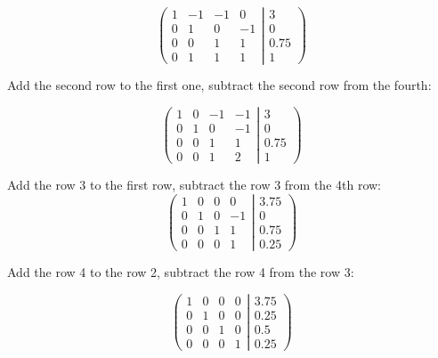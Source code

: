 \documentclass{article}
\begin{document}
\begin{equation*}
\left(
  \begin{matrix}
  1 & -1 & -1 & 0 \\
  0 & 1 & 0 & -1 \\
  0 & 0 & 1 & 1 \\
  0 & 1 & 1 & 1
  \end{matrix}
  \right.\left|\left.
  \begin{matrix}
  3 \\ 0 \\ 0.75 \\ 1 
  \end{matrix}
  \right)\right.
\end{equation*}

Add the second row to the first one, subtract the second row from the fourth:

\begin{equation*}
\left(
  \begin{matrix}
  1 & 0 & -1 & -1 \\
  0 & 1 & 0 & -1 \\
  0 & 0 & 1 & 1 \\
  0 & 0 & 1 & 2
  \end{matrix}
  \right.\left|\left.
  \begin{matrix}
  3 \\ 0 \\ 0.75 \\ 1 
  \end{matrix}
  \right)\right.
\end{equation*}

Add the row 3 to the first row, subtract the row 3 from the 4th row:
\begin{equation*}
\left(
  \begin{matrix}
  1 & 0 & 0 & 0 \\
  0 & 1 & 0 & -1 \\
  0 & 0 & 1 & 1 \\
  0 & 0 & 0 & 1
  \end{matrix}
  \right.\left|\left.
  \begin{matrix}
  3.75 \\ 0 \\ 0.75 \\ 0.25 
  \end{matrix}
  \right)\right.
\end{equation*}

Add the row 4 to the row 2, subtract the row 4 from the row 3:

\begin{equation*}
\left(
  \begin{matrix}
  1 & 0 & 0 & 0 \\
  0 & 1 & 0 & 0 \\
  0 & 0 & 1 & 0 \\
  0 & 0 & 0 & 1
  \end{matrix}
  \right.\left|\left.
  \begin{matrix}
  3.75 \\ 0.25 \\ 0.5 \\ 0.25 
  \end{matrix}
  \right)\right.
\end{equation*}
\end{document}
